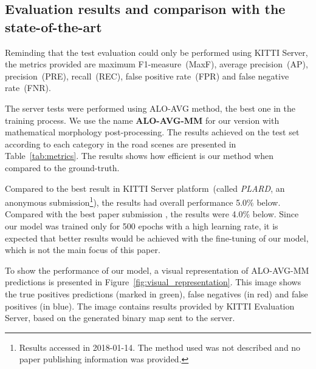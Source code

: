 \subsection{Evaluation results and comparison with the state-of-the-art}

Reminding that the test evaluation could only be performed using KITTI Server, the metrics provided are maximum F1-measure~(MaxF), average precision~(AP), precision~(PRE), recall~(REC), false positive rate~(FPR) and false negative rate~(FNR). 

The server tests were performed using ALO-AVG method, the best one in the training process. We use the name \textbf{ALO-AVG-MM} for our version with mathematical morphology post-processing. The results achieved on the test set according to each category in the road scenes are presented in Table~\ref{tab:metrics}. The results shows how efficient is our method when compared to the ground-truth.

Compared to the best result in KITTI Server platform~(called \textit{PLARD}, an anonymous submission\footnote{Results accessed in 2018-01-14. The method used was not described and no paper publishing information was provided.}), the results had overall performance 5.0\% below. Compared with the best paper submission \cite{Caltagirone2018}, the results were 4.0\% below. Since our model was trained only for 500 epochs with a high learning rate, it is expected that better results would be achieved with the fine-tuning of our model, which is not the main focus of this paper. %



To show the performance of our model, a visual representation of ALO-AVG-MM predictions is presented in Figure~\ref{fig:visual_representation}. This image shows the true positives predictions (marked in green), false negatives (in  red) and false positives (in blue). The image contains results provided by KITTI Evaluation Server, based on the generated binary map sent to the server.


